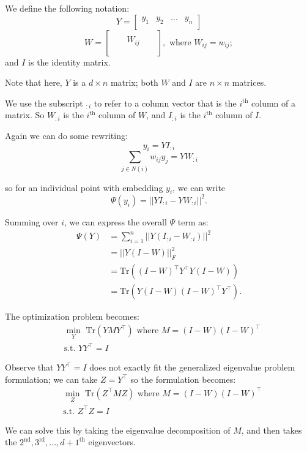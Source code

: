 We define the following notation:
\[Y=
\begin{bmatrix}
    y_1 & y_2 & \dots & y_n \\
\end{bmatrix}
\]
\[
W=
\begin{bmatrix}
    && && \\
    && W_{ij} && \\
    && && \\
\end{bmatrix}, \text{ where } W_{ij} = w_{ij};
\]
and $I$ is the identity matrix.

Note that here, $Y$ is a $d \times n$ matrix; both $W$ and $I$ are $n \times n$ matrices.

We use the subscript $_{:i}$ to refer to a column vector that is the $i^\text{th}$ column of a matrix. So $W_{:i}$ is the $i^\text{th}$ column of $W$, and $I_{:i}$ is the $i^\text{th}$ column of $I$.

Again we can do some rewriting:
\[
y_i = Y I_{:i}
\]
\[
\sum_{j\in N(i)} w_{ij} y_j = Y W_{:i}
\]

so for an individual point with embedding $y_i$, we can write
\[
\Psi (y_i) = ||Y I_{:i} - Y W_{:i}||^2.
\]

Summing over $i$, we can express the overall $\Psi$ term as:
\begin{align*}
\Psi(Y)
&= \sum\limits_{i=1}^n ||Y(I_{:i} - W_{:i})||^2 \\
&= ||Y (I - W)||_F^2 \\
&=\text{Tr}((I-W)^\intercal Y^\intercal Y (I-W)) \\
&=\text{Tr}(Y(I-W)(I-W)^\intercal Y^\intercal).
\end{align*}

The optimization problem becomes:
\begin{align*}
&\min_Y \text{ Tr}(YMY^\intercal) \text{ where } M = (I-W)(I-W)^\intercal \\
&\text{s.t. } Y Y^\intercal=I
\end{align*}

Observe that $Y Y^\intercal=I$ does not exactly fit the generalized eigenvalue problem formulation; we can take $Z = Y^\intercal$ so the formulation becomes:
\begin{align*}
&\min_Z \text{ Tr}(Z^\intercal MZ) \text{ where } M = (I-W)(I-W)^\intercal \\
&\text{s.t. } Z^\intercal Z=I
\end{align*}

We can solve this by taking the eigenvalue decomposition of $M$, and then takes the  $2^\text{nd},3^\text{rd},...,d+1^\text{th}$ eigenvectors.

